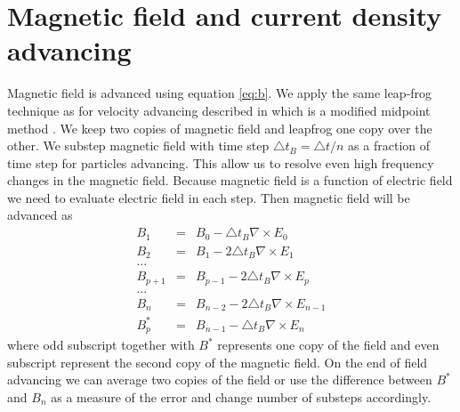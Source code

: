 \documentclass[oneside,branding,toc,article]{sat}
\begin{document}
\section{Magnetic field and current density advancing}
Magnetic field is advanced using equation \ref{eq:b}. We apply the same
leap-frog technique as for velocity advancing described in \cite{nr92} which is
a modified midpoint method \citep{nr92}.  We keep two copies of magnetic field
and leapfrog one copy over the other.  We substep magnetic field with time step
$\triangle t_B = \triangle t / n$ as a fraction of time step for particles
advancing.  This allow us to resolve even high frequency changes in the
magnetic field.  Because magnetic field is a function of electric field we need
to evaluate electric field in each step. Then magnetic field will be advanced
as
\begin{eqnarray}
  B_1 & = & B_0 - \triangle t_B \nabla \times E_0 \nonumber \\
  B_2 & = & B_1 - 2 \triangle t_B \nabla \times E_1 \nonumber \\
  ... \nonumber \\
  B_{p+1} & = & B_{p-1} - 2 \triangle t_B \nabla \times E_p \nonumber \\
  ... \nonumber \\
  B_{n} & = & B_{n-2} - 2 \triangle t_B \nabla \times E_{n-1} \nonumber \\
  B_{p}^* & = & B_{n-1} - \triangle t_B \nabla \times E_{n}
\end{eqnarray}
where odd subscript together with $B^*$ represents one copy of the field and
even subscript represent the second copy of the magnetic field.  On the end of
field advancing we can average two copies of the field or use the difference
between $B^*$ and $B_n$ as a measure of the error and change number of substeps
accordingly.
\end{document}
